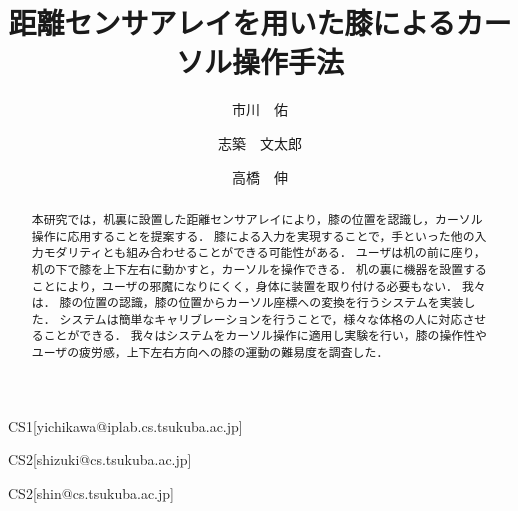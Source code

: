 \documentclass[submit, techrep]{ipsj}
\begin{document}
\title{距離センサアレイを用いた膝によるカーソル操作手法}






\author{市川　佑}{}{CS1}[yichikawa@iplab.cs.tsukuba.ac.jp]
\author{志築　文太郎}{}{CS2}[shizuki@cs.tsukuba.ac.jp]
\author{高橋　伸}{}{CS2}[shin@cs.tsukuba.ac.jp]

\begin{abstract}
本研究では，机裏に設置した距離センサアレイにより，膝の位置を認識し，カーソル操作に応用することを提案する．
膝による入力を実現することで，手といった他の入力モダリティとも組み合わせることができる可能性がある．
ユーザは机の前に座り，机の下で膝を上下左右に動かすと，カーソルを操作できる．
机の裏に機器を設置することにより，ユーザの邪魔になりにくく，身体に装置を取り付ける必要もない．
我々は．
膝の位置の認識，膝の位置からカーソル座標への変換を行うシステムを実装した．
システムは簡単なキャリブレーションを行うことで，様々な体格の人に対応させることができる．
我々はシステムをカーソル操作に適用し実験を行い，膝の操作性やユーザの疲労感，上下左右方向への膝の運動の難易度を調査した．
\end{abstract}






\maketitle

\end{document}
